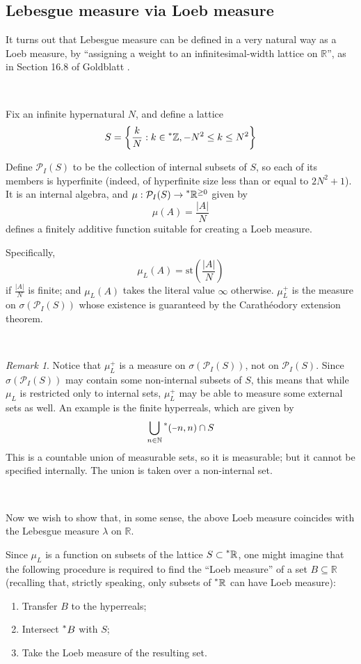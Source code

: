 \documentclass[11pt]{amsart}
\theoremstyle{remark}
\newtheorem*{remark}{Remark}
\newcommand{\st}{\mathrm{st}}
\newcommand{\hyp}[1][\mathbb{R}]{\prescript{*}{}{#1}}
\newcommand{\powerset}{\mathcal{P}}
\newcommand{\unaryminus}{\scalebox{0.75}[1.0]{\( - \)}}
\begin{document}
\subsection{Lebesgue measure via Loeb measure}
It turns out that Lebesgue measure can be defined in a very natural way as a Loeb measure, by ``assigning a weight to an infinitesimal-width lattice on $\mathbb{R}$'', as in Section 16.8 of Goldblatt \cite{goldblatt}.

\

\begin{defn} \label{defn:loeblebesgue}
Fix an infinite hypernatural $N$, and define a lattice $$S = \left \{ \frac{k}{N} : k \in \hyp[\mathbb{Z}], -N^2 \leq k \leq N^2 \right\}$$

Define $\powerset_I(S)$ to be the collection of internal subsets of $S$, so each of its members is hyperfinite (indeed, of hyperfinite size less than or equal to $2 N^2 + 1$).
It is an internal algebra, and $\mu: \powerset_I(S) \to \hyp^{\geq 0}$ given by $$\mu(A) = \frac{|A|}{N}$$ defines a finitely additive function suitable for creating a Loeb measure.

Specifically, $$\mu_L(A) = \st \left( \frac{|A|}{N} \right)$$ if $\frac{|A|}{N}$ is finite; and $\mu_L(A)$ takes the literal value $\infty$ otherwise.
$\mu_L^+$ is the measure on $\sigma(\powerset_I(S))$ whose existence is guaranteed by the Carath\'eodory extension theorem.

\end{defn}

\

\begin{remark}
Notice that $\mu_L^+$ is a measure on $\sigma(\powerset_I(S))$, not on $\powerset_I(S)$.
Since $\sigma(\powerset_I(S))$ may contain some non-internal subsets of $S$, this means that while $\mu_L$ is restricted only to internal sets, $\mu_L^+$ may be able to measure some external sets as well.
An example is the finite hyperreals, which are given by $$\bigcup_{n \in \mathbb{N}} \hyp[(] \unaryminus n, n) \cap S$$
This is a countable union of measurable sets, so it is measurable; but it cannot be specified internally.
The union is taken over a non-internal set.
\end{remark}

\

Now we wish to show that, in some sense, the above Loeb measure coincides with the Lebesgue measure $\lambda$ on $\mathbb{R}$.

Since $\mu_L$ is a function on subsets of the lattice $S \subset \hyp$, one might imagine that the following procedure is required to find the ``Loeb measure'' of a set $B \subseteq \mathbb{R}$ (recalling that, strictly speaking, only subsets of $\hyp$ can have Loeb measure):
\begin{enumerate}
\item Transfer $B$ to the hyperreals;
\item Intersect $\hyp[B]$ with $S$;
\item Take the Loeb measure of the resulting set.
\end{enumerate}
\end{document}
